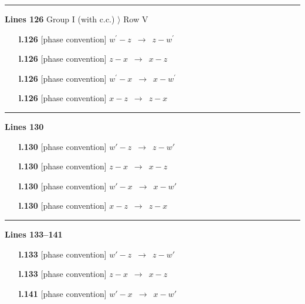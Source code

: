 \documentclass[10pt]{article}
\begin{document}
\noindent\rule{\linewidth}{0.3pt}\par\noindent\textbf{Lines 126} \quad \textsf{Group I (with c.c.) $\rangle$ Row V} \par
\begin{itemize}[leftmargin=2.2em,itemsep=1pt,topsep=2pt]
\item[\textbf{l.126}] \textsf{\small [phase convention]} $\displaystyle w^\prime-z$\ $\longrightarrow$\ $\displaystyle z-w^\prime$
\item[\textbf{l.126}] \textsf{\small [phase convention]} $\displaystyle z-x$\ $\longrightarrow$\ $\displaystyle x-z$
\item[\textbf{l.126}] \textsf{\small [phase convention]} $\displaystyle w^\prime-x$\ $\longrightarrow$\ $\displaystyle x-w^\prime$
\item[\textbf{l.126}] \textsf{\small [phase convention]} $\displaystyle x-z$\ $\longrightarrow$\ $\displaystyle z-x$
\end{itemize}
\noindent\rule{\linewidth}{0.3pt}\par\noindent\textbf{Lines 130} \par
\begin{itemize}[leftmargin=2.2em,itemsep=1pt,topsep=2pt]
\item[\textbf{l.130}] \textsf{\small [phase convention]} $\displaystyle w'-z$\ $\longrightarrow$\ $\displaystyle z-w'$
\item[\textbf{l.130}] \textsf{\small [phase convention]} $\displaystyle z-x$\ $\longrightarrow$\ $\displaystyle x-z$
\item[\textbf{l.130}] \textsf{\small [phase convention]} $\displaystyle w'-x$\ $\longrightarrow$\ $\displaystyle x-w'$
\item[\textbf{l.130}] \textsf{\small [phase convention]} $\displaystyle x-z$\ $\longrightarrow$\ $\displaystyle z-x$
\end{itemize}
\noindent\rule{\linewidth}{0.3pt}\par\noindent\textbf{Lines 133--141} \par
\begin{itemize}[leftmargin=2.2em,itemsep=1pt,topsep=2pt]
\item[\textbf{l.133}] \textsf{\small [phase convention]} $\displaystyle w'-z$\ $\longrightarrow$\ $\displaystyle z-w'$
\item[\textbf{l.133}] \textsf{\small [phase convention]} $\displaystyle z-x$\ $\longrightarrow$\ $\displaystyle x-z$
\item[\textbf{l.141}] \textsf{\small [phase convention]} $\displaystyle w'-x$\ $\longrightarrow$\ $\displaystyle x-w'$
\end{itemize}
\end{document}
